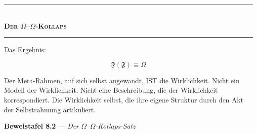 \documentclass[10pt, openany, oneside]{book}
\renewcommand{\normalsize}{\fontsize{10}{13}\selectfont}
\begin{document}
\vspace{1.5em}


\begin{center}
    \rule{0.3\textwidth}{0.4pt}\\[0.5em]
    {\normalsize\bfseries\scshape Der $\Omega$--$\Omega$-Kollaps}\\[0.3em]
    \rule{0.3\textwidth}{0.4pt}
\end{center}

\vspace{1em}

\noindent Das Ergebnis:

$$\boxed{\mathfrak{F}(\mathfrak{F}) \equiv \Omega}$$

Der Meta-Rahmen, auf sich selbst angewandt, IST die Wirklichkeit. Nicht ein Modell der Wirklichkeit. Nicht eine Beschreibung, die der Wirklichkeit korrespondiert. Die Wirklichkeit selbst, die ihre eigene Struktur durch den Akt der Selbstrahmung artikuliert.

\vspace{0.5em}

\textbf{Beweistafel 8.2} --- \textit{Der $\Omega$--$\Omega$-Kollaps-Satz}

\vspace{0.5em}
\end{document}
